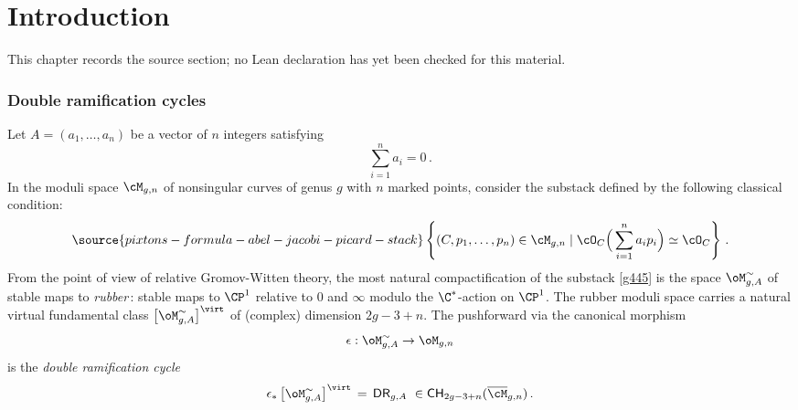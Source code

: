 \chapter{Introduction}
\label{pixtons-formula-abel-jacobi-picard-stack-chapter-01}

\begin{remark}
\label{pixtons-formula-abel-jacobi-picard-stack-chapter-01-source}
This chapter records the source section; no Lean declaration has yet been checked for this material.
\notready
\end{remark}



\subsection{Double ramification cycles}
\label{Ssec:DRclassic}

Let $A = (a_1, \dots, a_n)$ be a vector of $n$ integers satisfying
$$\sum_{i=1}^n a_i = 0\,. $$ In the moduli space $\cM_{g,n}$ of
nonsingular curves of genus $g$ with $n$ marked points,
 consider the substack defined by the following classical condition:
\begin{equation}\label{g445}
\source{pixtons-formula-abel-jacobi-picard-stack}
\left\{ (C, p_1, \dots, p_n) \in \cM_{g,n} \mid
\cO_C\Big(\sum_{i=1}^n a_i p_i\Big) \simeq \cO_C \right\}\, .
\end{equation}
From the point of view of relative Gromov-Witten theory,
the most natural compactification of the substack \eqref{g445}
is the space $\oM^{\sim}_{g,A}$ of stable maps to
{\em rubber}\,: stable maps to
 $\CP^1$ relative to $0$ and $\infty$ modulo the $\C^*$-action on $\CP^1$.
The rubber moduli space carries a natural virtual fundamental class $\left[\oM^{\sim}_{g,A}\right]^\virt$ of (complex)
dimension $2g-3+n$. The pushforward
via the canonical morphism
$$ \epsilon:\oM^{\sim}_{g,A} \rightarrow  \oM_{g,n}$$
is the {\em double ramification cycle}
$$\epsilon_*\left[\oM^{\sim}_{g,A}\right]^\virt\, =\, \mathsf{DR}_{g,A}\ \in
{\mathsf{CH}}_{2g-3+n}(\overline{\cM}_{g,n})\,. $$


